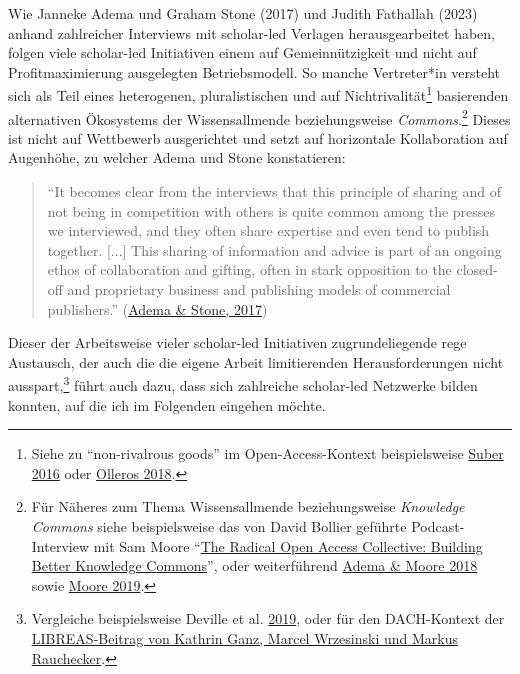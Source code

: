 \documentclass[a4paper,
fontsize=11pt,
oneside,
numbers=noperiodatend,
parskip=half-,
bibliography=totoc,
final
]{scrartcl}
\begin{document}
Wie Janneke Adema und Graham Stone (2017) und Judith Fathallah (2023)
anhand zahlreicher Interviews mit scholar-led Verlagen herausgearbeitet
haben, folgen viele scholar-led Initiativen einem auf Gemeinnützigkeit
und nicht auf Profitmaximierung ausgelegten Betriebsmodell. So manche
Vertreter*in versteht sich als Teil eines heterogenen, pluralistischen
und auf Nichtrivalität\footnote{Siehe zu \enquote{non-rivalrous goods}
  im Open-Access-Kontext beispielsweise
  \href{https://knowledgeunbound.mitpress.mit.edu/pub/cjktrtqe/release/1}{Suber
  2016} oder \href{https://doi.org/10.5210/fm.v23i2.8161}{Olleros 2018}.}
basierenden alternativen Ökosystems der Wissensallmende beziehungsweise
\emph{Commons}.\footnote{Für Näheres zum Thema Wissensallmende
  beziehungsweise \emph{Knowledge Commons} siehe beispielsweise das von
  David Bollier geführte Podcast-Interview mit Sam Moore
  \enquote{\href{http://www.bollier.org/blog/radical-open-access-collective-building-better-knowledge-commons,}{The
  Radical Open Access Collective: Building Better Knowledge Commons}},
  oder weiterführend \href{http://doi.org/10.1629/uksg.399}{Adema \&
  Moore 2018} sowie \href{https://doi.org/10.17613/st5m-cx33}{Moore
  2019}.} Dieses ist nicht auf Wettbewerb ausgerichtet und setzt auf
horizontale Kollaboration auf Augenhöhe, zu welcher Adema und Stone
konstatieren:

\begin{quote}
\enquote{It becomes clear from the interviews that this principle of
sharing and of not being in competition with others is quite common
among the presses we interviewed, and they often share expertise and
even tend to publish together. {[}...{]} This sharing of information and
advice is part of an ongoing ethos of collaboration and gifting, often
in stark opposition to the closed-off and proprietary business and
publishing models of commercial publishers.}
(\href{https://repository.jisc.ac.uk/6666/}{Adema \& Stone, 2017})
\end{quote}

Dieser der Arbeitsweise vieler scholar-led Initiativen zugrundeliegende
rege Austausch, der auch die die eigene Arbeit limitierenden
Herausforderungen nicht ausspart,\footnote{Vergleiche beispielsweise
  Deville et al. \href{https://doi.org/10.18352/lq.10277}{2019}, oder
  für den DACH-Kontext der
  \href{https://doi.org/10.18452/21418}{LIBREAS-Beitrag von Kathrin
  Ganz, Marcel Wrzesinski und Markus Rauchecker}.} führt auch dazu, dass
sich zahlreiche scholar-led Netzwerke bilden konnten, auf die ich im
Folgenden eingehen möchte.
\end{document}
